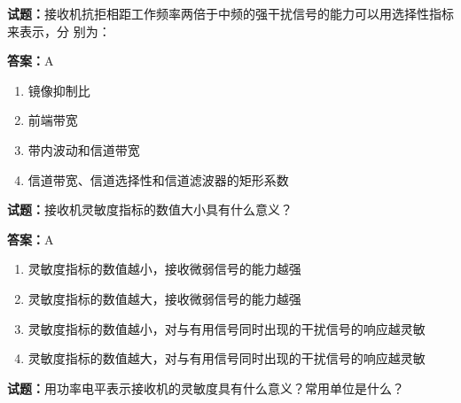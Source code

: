 \documentclass{ctexbook}
\begin{document}




\vspace{1em}

\textbf{试题：}接收机抗拒相距工作频率两倍于中频的强干扰信号的能力可以用选择性指标来表示，分
别为： 

\textbf{答案：}A 

\begin{enumerate}[leftmargin=3em]
  \item 镜像抑制比 

  \item 前端带宽 

  \item 带内波动和信道带宽 

  \item 信道带宽、信道选择性和信道滤波器的矩形系数 

\end{enumerate}





\vspace{1em}

\textbf{试题：}接收机灵敏度指标的数值大小具有什么意义？ 

\textbf{答案：}A 

\begin{enumerate}[leftmargin=3em]
  \item 灵敏度指标的数值越小，接收微弱信号的能力越强 

  \item 灵敏度指标的数值越大，接收微弱信号的能力越强 

  \item 灵敏度指标的数值越小，对与有用信号同时出现的干扰信号的响应越灵敏 

  \item 灵敏度指标的数值越大，对与有用信号同时出现的干扰信号的响应越灵敏 

\end{enumerate}





\vspace{1em}

\textbf{试题：}用功率电平表示接收机的灵敏度具有什么意义？常用单位是什么？ 
\end{document}

